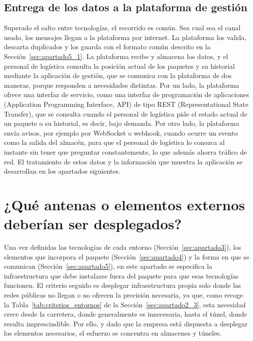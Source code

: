 \documentclass[11pt,a4paper]{article}
\begin{document}
\subsection{Entrega de los datos a la plataforma de gestión}
\label{sec:apartado5_4}

Superado el salto entre tecnologías, el recorrido es común. Sea cual sea el canal usado, los mensajes llegan a la plataforma por internet. La plataforma los valida, descarta duplicados y los guarda con el formato común descrito en la Sección~\ref{sec:apartado5_1}. La plataforma recibe y almacena los datos, y el personal de logística consulta la posición actual de los paquetes y su historial mediante la aplicación de gestión, que se comunica con la plataforma de dos maneras, porque responden a necesidades distintas. Por un lado, la plataforma ofrece una interfaz de servicio, como una interfaz de programación de aplicaciones (Application Programming Interface, API) de tipo REST (Representational State Transfer), que se consulta cuando el personal de logística pide el estado actual de un paquete o su historial, es decir, bajo demanda. Por otro lado, la plataforma envía avisos, por ejemplo por WebSocket o webhook, cuando ocurre un evento como la salida del almacén, para que el personal de logística lo conozca al instante sin tener que preguntar constantemente, lo que además ahorra tráfico de red. El tratamiento de estos datos y la información que muestra la aplicación se desarrollan en los apartados siguientes.

\clearpage
\section{¿Qué antenas o elementos externos deberían ser desplegados?}
\label{sec:apartado6}

Una vez definidas las tecnologías de cada entorno (Sección~\ref{sec:apartado3}), los elementos que incorpora el paquete (Sección~\ref{sec:apartado4}) y la forma en que se comunican (Sección~\ref{sec:apartado5}), en este apartado se especifica la infraestructura que debe instalarse fuera del paquete para que esas tecnologías funcionen. El criterio seguido es desplegar infraestructura propia solo donde las redes públicas no llegan o no ofrecen la precisión necesaria, ya que, como recoge la Tabla~\ref{tab:criterios_entornos} de la Sección~\ref{sec:apartado2_3}, esta necesidad crece desde la carretera, donde generalmente es innecesaria, hasta el túnel, donde resulta imprescindible. Por ello, y dado que la empresa está dispuesta a desplegar los elementos necesarios, el esfuerzo se concentra en almacenes y túneles.
\end{document}

